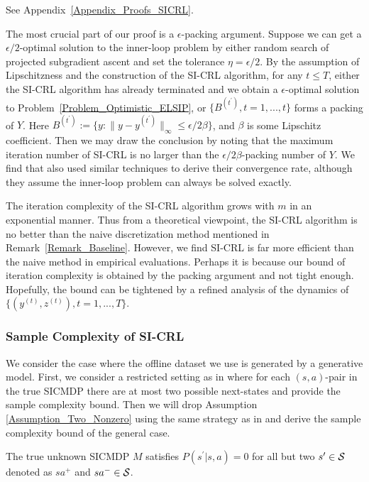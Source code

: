 See Appendix~\ref{Appendix_Proofs_SICRL}.
\endproof

The most crucial part of our proof is a $\epsilon$-packing argument.
Suppose we can get a $\epsilon/2$-optimal solution to the inner-loop problem by either random search of projected subgradient ascent and set the tolerance $\eta=\epsilon/2$.
By the assumption of Lipschitzness and the construction of the SI-CRL algorithm, for any $t\leq T$, either the SI-CRL algorithm has already terminated and we obtain a $\epsilon$-optimal solution to Problem~\ref{Problem_Optimistic_ELSIP}, or $\{B^{(t^\prime)},t=1,...,t\}$ forms a packing of $Y$.
Here $B^{(t^\prime)}:=\{y:\|y-y^{(t^\prime)}\|_\infty\leq \epsilon/2\beta\}$, and $\beta$ is some Lipschitz coefficient.
Then we may draw the conclusion by noting that the maximum iteration number of SI-CRL is no larger than the $\epsilon/2\beta$-packing number of $Y$.
We find that \cite{Hu1990} also used similar techniques to derive their convergence rate, although they assume the inner-loop problem can always be solved exactly.

\begin{remark}
    The iteration complexity of the SI-CRL algorithm grows with $m$ in an exponential manner.
    Thus from a theoretical viewpoint, the SI-CRL algorithm is no better than the naive discretization method mentioned in Remark~\ref{Remark_Baseline}.
    However, we find SI-CRL is far more efficient than the naive method in empirical evaluations.
    Perhaps it is because our bound of iteration complexity is obtained by the packing argument and not tight enough.
    Hopefully, the bound can be tightened by a refined analysis of the dynamics of $\{(y^{(t)}, z^{(t)}),t=1,...,T\}$.
\end{remark}

\subsubsection{Sample Complexity of SI-CRL}
We consider the case where the offline dataset we use is generated by a generative model.
First, we consider a restricted setting as in \cite{LATTIMORE2014125} where for each $(s,a)$-pair in the true SICMDP there are at most two possible next-states and provide the sample complexity bound.
Then we will drop Assumption \ref{Assumption_Two_Nonzero} using the same strategy as in \cite{LATTIMORE2014125} and derive the sample complexity bound of the general case.
\begin{assumption}\label{Assumption_Two_Nonzero}
The true unknown SICMDP $M$ satisfies $P(s^\prime|s,a)=0$ for all but two $s^\prime\in {\mathcal{S}}$ denoted as $sa^+$ and  $sa^-\in {\mathcal{S}}$.
\end{assumption}


